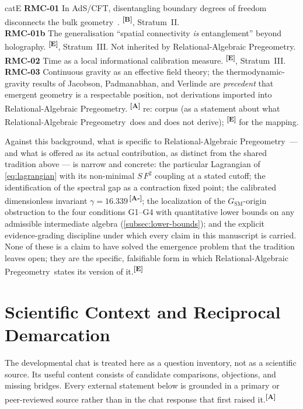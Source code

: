\documentclass[12pt,a4paper,twoside]{article}
\theoremstyle{plain}
\theoremstyle{definition}
\theoremstyle{remark}
\newcommand{\ProjectShort}{Relational-Algebraic Pregeometry}
\newcommand{\RAP}{\ProjectShort}
\newcommand{\catmark}[1]{\textsuperscript{\textsf{\textbf{[#1]}}}}
\newcommand{\GammaGeom}{16.339} %
\begin{document}
\begin{evidencebox}{catE}
\textbf{RMC-01} In AdS/CFT, disentangling boundary degrees of freedom
disconnects the bulk geometry~\cite{vanraamsdonk2010}. \catmark{B},
Stratum~II.\\[0.25em]
\textbf{RMC-01b} The generalisation ``spatial connectivity \emph{is}
entanglement'' beyond holography. \catmark{E}, Stratum~III. Not inherited
by \RAP.\\[0.25em]
\textbf{RMC-02} Time as a local informational calibration measure.
\catmark{E}, Stratum~III.\\[0.25em]
\textbf{RMC-03} Continuous gravity as an effective field theory; the
thermodynamic-gravity results of Jacobson, Padmanabhan, and Verlinde are
\emph{precedent} that emergent geometry is a respectable position, not
derivations imported into \RAP. \catmark{A} re: corpus (as a statement
about what \RAP\ does and does not derive); \catmark{E} for the mapping.
\end{evidencebox}

\noindent Against this background, what is specific to \RAP\ --- and
what is offered as its actual contribution, as distinct from the shared
tradition above --- is narrow and concrete: the particular Lagrangian of
\cref{eq:lagrangian} with its non-minimal $S\,F^2$ coupling at a stated
cutoff; the identification of the spectral gap as a contraction fixed
point; the calibrated dimensionless invariant $\gamma =
\GammaGeom$\,\catmark{A-}; the localization of the
$G_{\mathrm{SM}}$-origin obstruction to the four conditions G1--G4 with
quantitative lower bounds on any admissible intermediate algebra
(\cref{subsec:lower-bounds}); and the explicit evidence-grading
discipline under which every claim in this manuscript is carried. None of
these is a claim to have solved the emergence problem that the tradition
leaves open; they are the specific, falsifiable form in which \RAP\
states its version of it.\catmark{E}

\newpage
\section{Scientific Context and Reciprocal Demarcation}
\label{sec:ctx-scientific-context}

The developmental chat is treated here as a question inventory, not as a
scientific source. Its useful content consists of candidate comparisons,
objections, and missing bridges. Every external statement below is grounded in
a primary or peer-reviewed source rather than in the chat response that first
raised it.\catmark{A}
\end{document}
